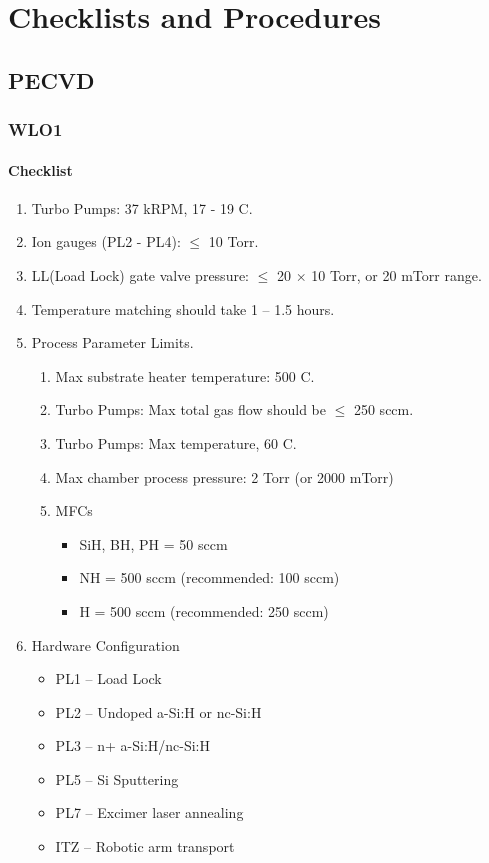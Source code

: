 \chapter{Checklists and Procedures}
\section{PECVD}
\subsection{WLO1}
\subsubsection{Checklist}
\begin{enumerate}
\item Turbo Pumps: 37 kRPM, 17 - 19 C.
\item Ion gauges (PL2 - PL4): $ \leq $ 10 Torr.
\item LL(Load Lock) gate valve pressure: $ \leq $ 20 $\times$ 10 Torr, or 20 mTorr range.
\item Temperature matching should take 1 -- 1.5 hours.
\item Process Parameter Limits.
  \begin{enumerate}
  \item Max substrate heater temperature: 500 C.
  \item Turbo Pumps: Max total gas flow should be $\leq$ 250 sccm.
  \item Turbo Pumps: Max temperature, 60 C.
  \item Max chamber process pressure: 2 Torr (or 2000 mTorr)
  \item MFCs
    \begin{itemize}
    \item SiH, BH, %
      PH = 50 sccm
    \item NH = 500 sccm (recommended: 100 sccm)
    \item H = 500 sccm (recommended: 250 sccm)
    \end{itemize}
  \end{enumerate}
\item Hardware Configuration
  \begin{itemize}
  \item PL1 -- Load Lock
  \item PL2 -- Undoped a-Si:H or nc-Si:H
  \item PL3 -- n+ a-Si:H/nc-Si:H
  \item PL5 -- Si Sputtering
  \item PL7 -- Excimer laser annealing
  \item ITZ -- Robotic arm transport 
  \end{itemize}
\end{enumerate}

